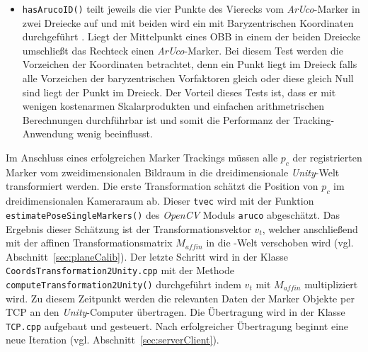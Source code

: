 \begin{itemize}
\item \texttt{hasArucoID()} teilt jeweils die vier Punkte des Vierecks vom \textit{ArUco}-Marker in zwei Dreiecke auf und mit beiden wird ein  mit Baryzentrischen Koordinaten durchgeführt \cite{article:BaryzentriFarin}. Liegt der Mittelpunkt eines OBB in einem der beiden Dreiecke umschließt das Rechteck einen \textit{ArUco}-Marker. Bei diesem Test werden die Vorzeichen der Koordinaten betrachtet, denn ein Punkt liegt im Dreieck falls alle Vorzeichen der baryzentrischen Vorfaktoren gleich oder diese gleich Null sind liegt der Punkt im Dreieck. Der Vorteil dieses Tests ist, dass er mit wenigen kostenarmen Skalarprodukten und einfachen arithmetrischen Berechnungen durchführbar ist und somit die Performanz der Tracking-Anwendung wenig beeinflusst. 
\end{itemize}
Im Anschluss eines erfolgreichen Marker Trackings müssen alle $p_c$ der registrierten Marker vom zweidimensionalen Bildraum in die dreidimensionale \textit{Unity}-Welt transformiert werden. Die erste Transformation schätzt die Position von $p_c$ im dreidimensionalen Kameraraum ab. Dieser \texttt{tvec} wird mit der Funktion \texttt{estimate\-Pose\-Single\-Markers()} des \textit{OpenCV} Moduls \texttt{aruco} abgeschätzt.
Das Ergebnis dieser Schätzung ist der Transformationsvektor $v_t$, welcher anschließend mit der affinen Transformationsmatrix $M_{affin}$ in die -Welt verschoben wird (vgl. Abschnitt~\ref{sec:planeCalib}). Der letzte Schritt wird in der Klasse \texttt{Coords\-Trans\-formation\-2Unity.cpp} mit der Methode \texttt{compute\-Transformation\-2Unity()} durchgeführt indem $v_t$ mit $M_{affin}$ multipliziert wird. Zu diesem Zeitpunkt werden die relevanten Daten der Marker Objekte per TCP an den \textit{Unity}-Computer übertragen. Die Übertragung wird in der Klasse \texttt{TCP.cpp} aufgebaut und gesteuert. Nach erfolgreicher Übertragung beginnt eine neue Iteration (vgl. Abschnitt~\ref{sec:serverClient}).

\newpage